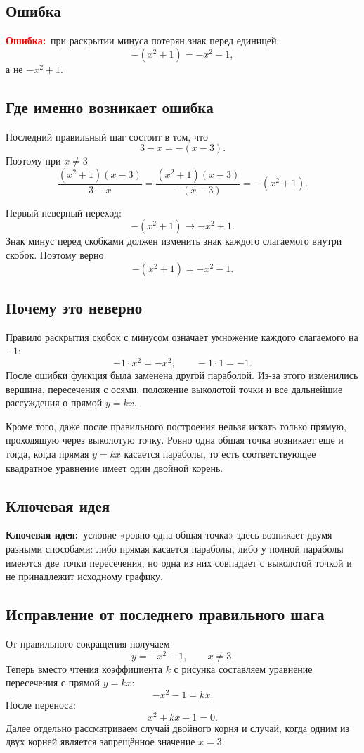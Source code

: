 \documentclass[12pt,a4paper]{article}
\newcommand{\errlabel}{\textcolor{red}{\textbf{Ошибка:}}}
\newcommand{\keyidea}{\textcolor{blue!60!black}{\textbf{Ключевая идея:}}}
\begin{document}
\subsection*{Ошибка}
\errlabel\ при раскрытии минуса потерян знак перед единицей:
\[
-(x^2+1)=-x^2-1,
\]
а не $-x^2+1$.

\subsection*{Где именно возникает ошибка}
Последний правильный шаг состоит в том, что
\[
3-x=-(x-3).
\]
Поэтому при $x\ne3$
\[
\frac{(x^2+1)(x-3)}{3-x}
=
\frac{(x^2+1)(x-3)}{-(x-3)}
=-(x^2+1).
\]

Первый неверный переход:
\[
-(x^2+1)\longrightarrow -x^2+1.
\]
Знак минус перед скобками должен изменить знак каждого слагаемого внутри скобок. Поэтому верно
\[
-(x^2+1)=-x^2-1.
\]

\subsection*{Почему это неверно}
Правило раскрытия скобок с минусом означает умножение каждого слагаемого на $-1$:
\[
-1\cdot x^2=-x^2,
\qquad
-1\cdot1=-1.
\]
После ошибки функция была заменена другой параболой. Из-за этого изменились вершина, пересечения с осями, положение выколотой точки и все дальнейшие рассуждения о прямой $y=kx$.

Кроме того, даже после правильного построения нельзя искать только прямую, проходящую через выколотую точку. Ровно одна общая точка возникает ещё и тогда, когда прямая $y=kx$ касается параболы, то есть соответствующее квадратное уравнение имеет один двойной корень.

\subsection*{Ключевая идея}
\keyidea\ условие «ровно одна общая точка» здесь возникает двумя разными способами: либо прямая касается параболы, либо у полной параболы имеются две точки пересечения, но одна из них совпадает с выколотой точкой и не принадлежит исходному графику.

\subsection*{Исправление от последнего правильного шага}
От правильного сокращения получаем
\[
y=-x^2-1,
\qquad x\ne3.
\]
Теперь вместо чтения коэффициента $k$ с рисунка составляем уравнение пересечения с прямой $y=kx$:
\[
-x^2-1=kx.
\]
После переноса:
\[
x^2+kx+1=0.
\]
Далее отдельно рассматриваем случай двойного корня и случай, когда одним из двух корней является запрещённое значение $x=3$.
\end{document}
